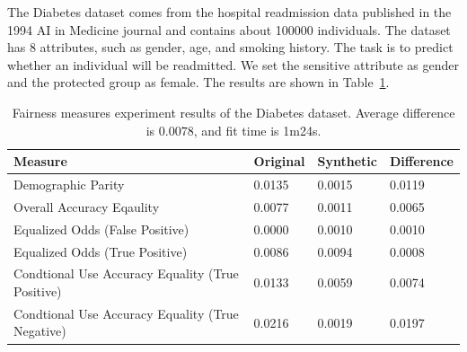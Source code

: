 \documentclass[manuscript,screen,review,anonymous]{acmart}
\begin{document}
The Diabetes\cite{diabetes_34,Kaggle_Diabetes_Prediction} dataset comes from the hospital readmission data published in the 1994 AI in Medicine journal and contains about 100000 individuals. The dataset has 8 attributes, such as gender, age, and smoking history. The task is to predict whether an individual will be readmitted. We set the sensitive attribute as gender and the protected group as female. The results are shown in Table~\ref{tab:diabetes_score}.




\begin{table}[h]
\caption{
    Fairness measures experiment results of the Diabetes dataset.
    Average difference is $0.0078$, and fit time is 1m24s.
}
\label{tab:diabetes_score}
\begin{tabular}{llll}
\toprule
\textbf{Measure} & \textbf{Original} & \textbf{Synthetic} & \textbf{Difference} \\
\midrule
Demographic Parity  & 0.0135 & 0.0015 & 0.0119 \\
Overall Accuracy Eqaulity   & 0.0077 & 0.0011 & 0.0065 \\
Equalized Odds (False Positive)    & 0.0000 & 0.0010 & 0.0010 \\
Equalized Odds (True Positive)    & 0.0086 & 0.0094 & 0.0008 \\
Condtional Use Accuracy Equality (True Positive) & 0.0133 & 0.0059 & 0.0074 \\
Condtional Use Accuracy Equality (True Negative) & 0.0216 & 0.0019 & 0.0197 \\
\bottomrule
\end{tabular}
\end{table}
\end{document}
